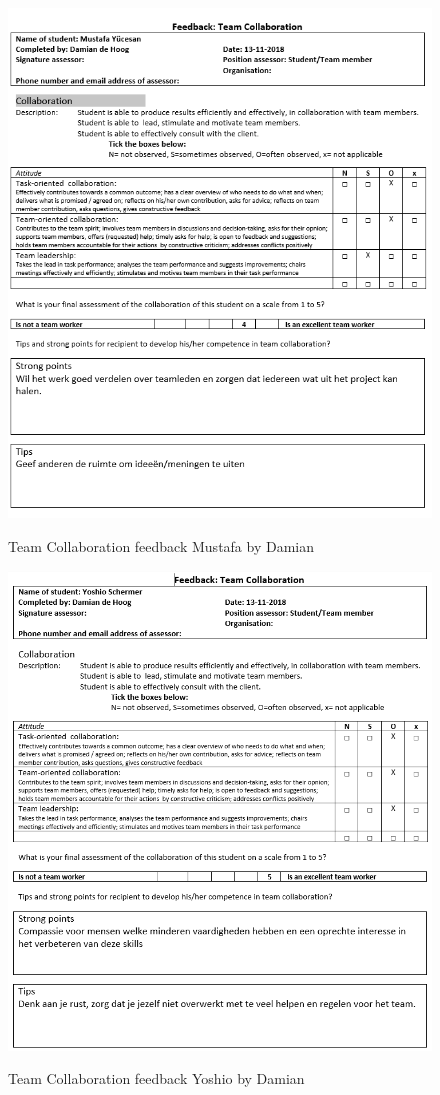 \documentclass[12pt]{article}
\begin{document}
	\begin{figure}[p!]
		\centering
		\includegraphics[width=\columnwidth]{CoopMustafa.PNG}\\
		\caption{Team Collaboration feedback Mustafa by Damian}
	\end{figure}
	\begin{figure}[p!]
		\centering
		\includegraphics[width=\columnwidth]{CoopYoshio.PNG}\\
		\caption{Team Collaboration feedback Yoshio by Damian}
	\end{figure}
\end{document}
